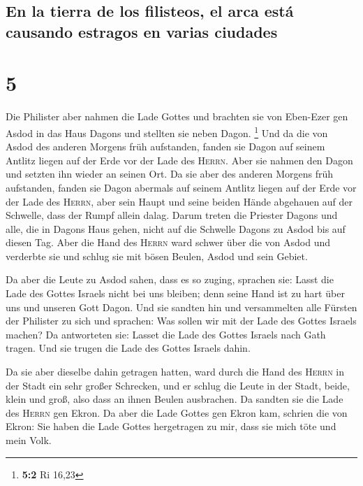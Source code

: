 \hypertarget{en-la-tierra-de-los-filisteos-el-arca-estuxe1-causando-estragos-en-varias-ciudades}{%
\subsection{En la tierra de los filisteos, el arca está causando
estragos en varias
ciudades}\label{en-la-tierra-de-los-filisteos-el-arca-estuxe1-causando-estragos-en-varias-ciudades}}

\hypertarget{section-4}{%
\section{5}\label{section-4}}

 Die Philister aber nahmen die Lade Gottes und brachten
sie von Eben-Ezer gen Asdod  in das Haus Dagons und
stellten sie neben Dagon. \footnote{\textbf{5:2} Ri 16,23}
 Und da die von Asdod des anderen Morgens früh aufstanden,
fanden sie Dagon auf seinem Antlitz liegen auf der Erde vor der Lade des
\textsc{Herrn}. Aber sie nahmen den Dagon und setzten ihn wieder an
seinen Ort.  Da sie aber des anderen Morgens früh
aufstanden, fanden sie Dagon abermals auf seinem Antlitz liegen auf der
Erde vor der Lade des \textsc{Herrn}, aber sein Haupt und seine beiden
Hände abgehauen auf der Schwelle, dass der Rumpf allein dalag.
 Darum treten die Priester Dagons und alle, die in Dagons
Haus gehen, nicht auf die Schwelle Dagons zu Asdod bis auf diesen Tag.
 Aber die Hand des \textsc{Herrn} ward schwer über die von
Asdod und verderbte sie und schlug sie mit bösen Beulen, Asdod und sein
Gebiet.

 Da aber die Leute zu Asdod sahen, dass es so zuging,
sprachen sie: Lasst die Lade des Gottes Israels nicht bei uns bleiben;
denn seine Hand ist zu hart über uns und unseren Gott Dagon.
 Und sie sandten hin und versammelten alle Fürsten der
Philister zu sich und sprachen: Was sollen wir mit der Lade des Gottes
Israels machen? Da antworteten sie: Lasset die Lade des Gottes Israels
nach Gath tragen. Und sie trugen die Lade des Gottes Israels dahin.

 Da sie aber dieselbe dahin getragen hatten, ward durch
die Hand des \textsc{Herrn} in der Stadt ein sehr großer Schrecken, und
er schlug die Leute in der Stadt, beide, klein und groß, also dass an
ihnen Beulen ausbrachen.  Da sandten sie die Lade des
\textsc{Herrn} gen Ekron. Da aber die Lade Gottes gen Ekron kam, schrien
die von Ekron: Sie haben die Lade Gottes hergetragen zu mir, dass sie
mich töte und mein Volk.

